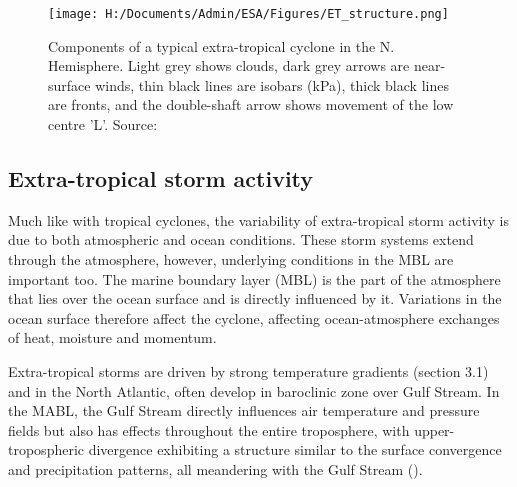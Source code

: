 \begin{figure}[h]
	\centering
	\noindent\texttt{[image: H:/Documents/Admin/ESA/Figures/ET\_structure.png]}
	\caption{Components of a typical extra-tropical cyclone in the N. Hemisphere. Light grey shows clouds, dark grey arrows are near-surface winds, thin black lines are isobars (kPa), thick black lines are fronts, and the double-shaft arrow shows movement of the low centre 'L'. Source: \cite{stull} }\label{fig:ET_structure}
\end{figure}



\subsection {Extra-tropical storm activity} %
%
Much like with tropical cyclones, the variability of extra-tropical storm activity is due to both atmospheric and ocean conditions. These storm systems extend through the atmosphere, however, underlying conditions in the MBL are important too. The marine boundary layer (MBL) is the part of the atmosphere that lies over the ocean surface and is directly influenced by it.  Variations in the ocean surface therefore affect the cyclone, affecting ocean-atmosphere exchanges of heat, moisture and momentum.


Extra-tropical storms are driven by strong temperature gradients (section 3.1) and in the North Atlantic, often develop in baroclinic zone over Gulf Stream. In the MABL, the Gulf Stream directly influences air temperature and pressure fields but also has effects throughout the entire troposphere, with upper-tropospheric divergence exhibiting a structure similar to the surface convergence and precipitation patterns, all meandering with the Gulf Stream (\citep{minobe2008influence}).

